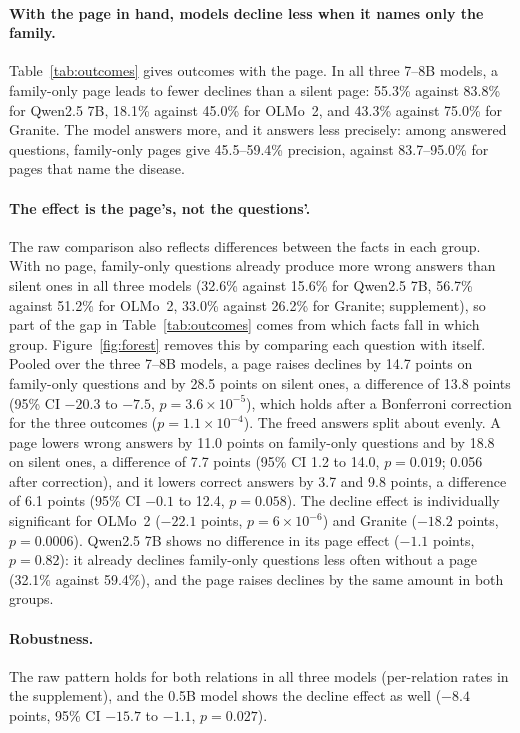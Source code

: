 \documentclass[letterpaper]{article} %
\begin{document}
\paragraph{With the page in hand, models decline less when it names only the
family.}
Table~\ref{tab:outcomes} gives outcomes with the page. In all three 7--8B
models, a family-only page leads to fewer declines than a silent page: 55.3\%
against 83.8\% for Qwen2.5 7B, 18.1\% against 45.0\% for OLMo~2, and 43.3\%
against 75.0\% for Granite. The model answers more, and it answers less
precisely: among answered questions, family-only pages give 45.5--59.4\%
precision, against 83.7--95.0\% for pages that name the disease.


\paragraph{The effect is the page's, not the questions'.}
The raw comparison also reflects differences between the facts in each group.
With no page, family-only questions already produce more wrong answers than
silent ones in all three models (32.6\% against 15.6\% for Qwen2.5 7B, 56.7\%
against 51.2\% for OLMo~2, 33.0\% against 26.2\% for Granite; supplement), so part of the gap in Table~\ref{tab:outcomes} comes from which facts
fall in which group. Figure~\ref{fig:forest} removes this by comparing each
question with itself. Pooled over the three
7--8B models, a page raises declines by 14.7 points on family-only questions
and by 28.5 points on silent ones, a difference of 13.8 points (95\% CI
$-20.3$ to $-7.5$, $p = 3.6\times10^{-5}$), which holds after a Bonferroni
correction for the three outcomes ($p = 1.1\times10^{-4}$). The freed
answers split about evenly. A page lowers wrong answers by 11.0 points on
family-only questions and by 18.8 on silent ones, a difference of 7.7 points
(95\% CI 1.2 to 14.0, $p = 0.019$; 0.056 after correction), and it lowers
correct answers by 3.7 and 9.8 points, a difference of 6.1 points (95\% CI
$-0.1$ to 12.4, $p = 0.058$). The decline effect is individually significant
for OLMo~2 ($-22.1$ points, $p = 6\times10^{-6}$) and Granite ($-18.2$ points,
$p = 0.0006$). Qwen2.5 7B shows no difference in its page effect ($-1.1$
points, $p = 0.82$): it already declines family-only questions less often
without a page (32.1\% against 59.4\%), and the page
raises declines by the same amount in both groups.

\paragraph{Robustness.}
The raw pattern holds for both relations in all three models (per-relation
rates in the supplement), and the 0.5B model shows the decline effect as well
($-8.4$ points, 95\% CI $-15.7$ to $-1.1$, $p = 0.027$).
\end{document}

